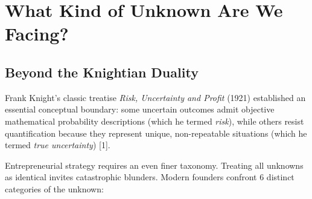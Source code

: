\section{What Kind of Unknown Are We Facing?}

\subsection{Beyond the Knightian Duality}

Frank Knight's classic treatise \textit{Risk, Uncertainty and Profit} (1921) established an essential conceptual boundary: some uncertain outcomes admit objective mathematical probability descriptions (which he termed \textit{risk}), while others resist quantification because they represent unique, non-repeatable situations (which he termed \textit{true uncertainty}) [1].

Entrepreneurial strategy requires an even finer taxonomy. Treating all unknowns as identical invites catastrophic blunders. Modern founders confront 6 distinct categories of the unknown:

